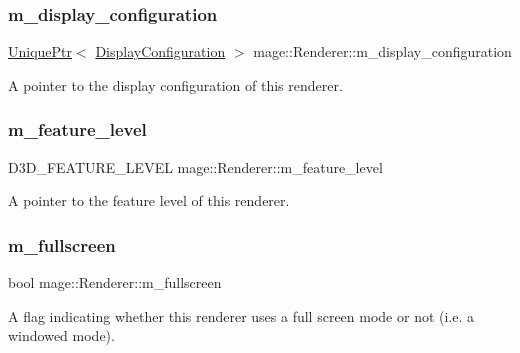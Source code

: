\subsubsection{\texorpdfstring{m\+\_\+display\+\_\+configuration}{m\_display\_configuration}}
{\footnotesize\ttfamily \hyperlink{namespacemage_a3316d7143a973e37adf1110f2e80ca31}{Unique\+Ptr}$<$ \hyperlink{structmage_1_1_display_configuration}{Display\+Configuration} $>$ mage\+::\+Renderer\+::m\+\_\+display\+\_\+configuration\hspace{0.3cm}{\ttfamily [private]}}

A pointer to the display configuration of this renderer. \hypertarget{classmage_1_1_renderer_aa97b108ef58f7d41ddb527f6ba2bfdf9}{}\label{classmage_1_1_renderer_aa97b108ef58f7d41ddb527f6ba2bfdf9} 
\subsubsection{\texorpdfstring{m\+\_\+feature\+\_\+level}{m\_feature\_level}}
{\footnotesize\ttfamily D3\+D\+\_\+\+F\+E\+A\+T\+U\+R\+E\+\_\+\+L\+E\+V\+EL mage\+::\+Renderer\+::m\+\_\+feature\+\_\+level\hspace{0.3cm}{\ttfamily [private]}}

A pointer to the feature level of this renderer. \hypertarget{classmage_1_1_renderer_a72bb88b17491bd388460afae9d207b0a}{}\label{classmage_1_1_renderer_a72bb88b17491bd388460afae9d207b0a} 
\subsubsection{\texorpdfstring{m\+\_\+fullscreen}{m\_fullscreen}}
{\footnotesize\ttfamily bool mage\+::\+Renderer\+::m\+\_\+fullscreen\hspace{0.3cm}{\ttfamily [private]}}

A flag indicating whether this renderer uses a full screen mode or not (i.\+e. a windowed mode). \hypertarget{classmage_1_1_renderer_adadc1028e5ad6551abbecfd8529e4aa1}{}\label{classmage_1_1_renderer_adadc1028e5ad6551abbecfd8529e4aa1} 
